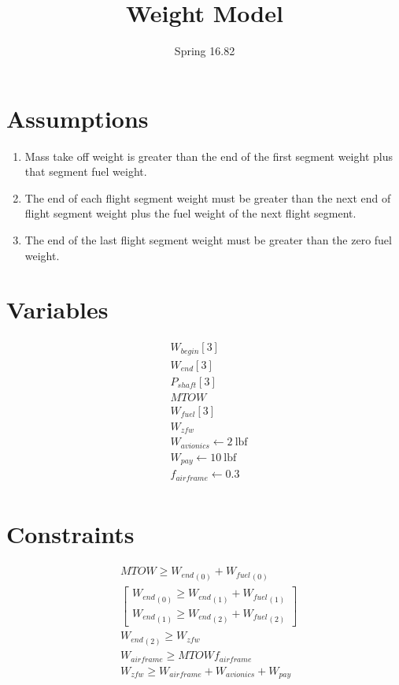 \documentclass[10pt, a4paper]{article}
\begin{document}
\title{Weight Model}
\author{Spring 16.82}
\maketitle

\section*{Assumptions} 

\begin{enumerate}

\item Mass take off weight is greater than the end of the first segment weight plus that segment fuel weight. 
\item The end of each flight segment weight must be greater than the next end of flight segment weight plus the fuel weight of the next flight segment.
\item The end of the last flight segment weight must be greater than the zero fuel weight.

\end{enumerate}

\section*{Variables}

\[\begin{array}{ll}
    & W_{begin}[3]\\
    & W_{end}[3]\\
    & P_{shaft}[3]\\
    & MTOW \\
    & W_{fuel}[3] \\
    & W_{zfw} \\
    & W_{avionics} \gets 2~\mathrm{lbf} \\
    & W_{pay} \gets 10~\mathrm{lbf} \\
    & f_{airframe} \gets 0.3\\
\end{array} \]

\section*{Constraints}

\[ \begin{array}{ll}
	& MTOW \geq {W_{end}}_{(0)} + {W_{fuel}}_{(0)} \\
	& \begin{bmatrix}{W_{end}}_{(0)} \geq {W_{end}}_{(1)} + {W_{fuel}}_{(1)} \\ {W_{end}}_{(1)} \geq {W_{end}}_{(2)} + {W_{fuel}}_{(2)}\end{bmatrix} \\
	& {W_{end}}_{(2)} \geq W_{zfw} \\
	& W_{airframe} \geq MTOW f_{airframe} \\
	& W_{zfw} \geq W_{airframe} + W_{avionics} + W_{pay} \\
\end{array} \]
\end{document}
